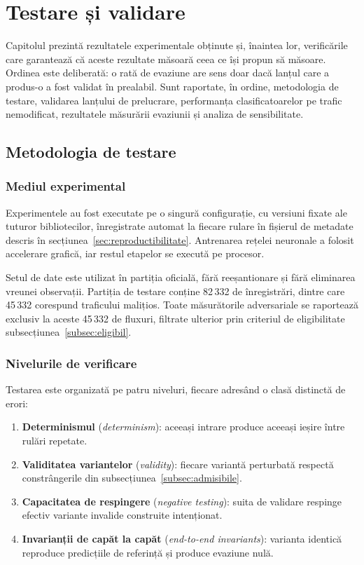 \chapter{Testare și validare}\label{ch:testare}
\pagestyle{fancy}

Capitolul prezintă rezultatele experimentale obținute și, înaintea lor, verificările care garantează că aceste rezultate măsoară ceea ce își propun să măsoare. Ordinea este deliberată: o rată de evaziune are sens doar dacă lanțul care a produs-o a fost validat în prealabil. Sunt raportate, în ordine, metodologia de testare, validarea lanțului de prelucrare, performanța clasificatoarelor pe trafic nemodificat, rezultatele măsurării evaziunii și analiza de sensibilitate.

\section{Metodologia de testare}\label{sec:metodologie}

\subsection{Mediul experimental}\label{subsec:mediu}

Experimentele au fost executate pe o singură configurație, cu versiuni fixate ale tuturor bibliotecilor, înregistrate automat la fiecare rulare în fișierul de metadate descris în secțiunea~\ref{sec:reproductibilitate}. Antrenarea rețelei neuronale a folosit accelerare grafică, iar restul etapelor se execută pe procesor.

Setul de date este utilizat în partiția oficială, fără reeșantionare și fără eliminarea vreunei observații. Partiția de testare conține 82\,332 de înregistrări, dintre care 45\,332 corespund traficului malițios. Toate măsurătorile adversariale se raportează exclusiv la aceste 45\,332 de fluxuri, filtrate ulterior prin criteriul de eligibilitate subsecțiunea~\ref{subsec:eligibil}.

\subsection{Nivelurile de verificare}\label{subsec:niveluri}

Testarea este organizată pe patru niveluri, fiecare adresând o clasă distinctă de erori:

\begin{enumerate}
    \item \textbf{Determinismul} (\textit{determinism}): aceeași intrare produce aceeași ieșire între rulări repetate.
    \item \textbf{Validitatea variantelor} (\textit{validity}): fiecare variantă perturbată respectă constrângerile din subsecțiunea~\ref{subsec:admisibile}.
    \item \textbf{Capacitatea de respingere} (\textit{negative testing}): suita de validare respinge efectiv variante invalide construite intenționat.
    \item \textbf{Invarianții de capăt la capăt} (\textit{end-to-end invariants}): varianta identică reproduce predicțiile de referință și produce evaziune nulă.
\end{enumerate}


